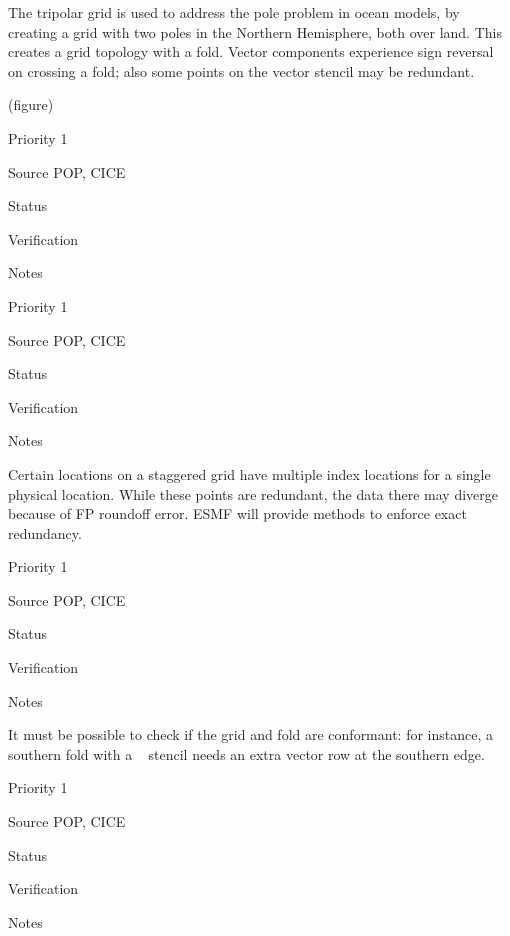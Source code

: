 
The tripolar grid \cite{ref:m1996} is used to address the pole problem
in ocean models, by creating a grid with two poles in the Northern
Hemisphere, both over land. This creates a grid topology with a
fold. Vector components experience sign reversal on crossing a fold;
also some points on the vector stencil may be redundant.

(figure)

\begin{reqlist}
\item[Priority] 1
\item[Source] POP, CICE
\item[Status]
\item[Verification]
\item[Notes]
\end{reqlist}


\begin{reqlist}
\item[Priority] 1
\item[Source] POP, CICE
\item[Status]
\item[Verification]
\item[Notes]
\end{reqlist}


Certain locations on a staggered grid have multiple index locations
for a single physical location. While these points are redundant, the
data there may diverge because of FP roundoff error. ESMF will provide
methods to enforce exact redundancy.

\begin{reqlist}
\item[Priority] 1
\item[Source] POP, CICE
\item[Status]
\item[Verification]
\item[Notes]
\end{reqlist}


It must be possible to check if the grid and fold are conformant:
for instance, a southern fold with a \bgrid~ stencil needs an extra
vector row at the southern edge.

\begin{reqlist}
\item[Priority] 1
\item[Source] POP, CICE
\item[Status]
\item[Verification]
\item[Notes]
\end{reqlist}

